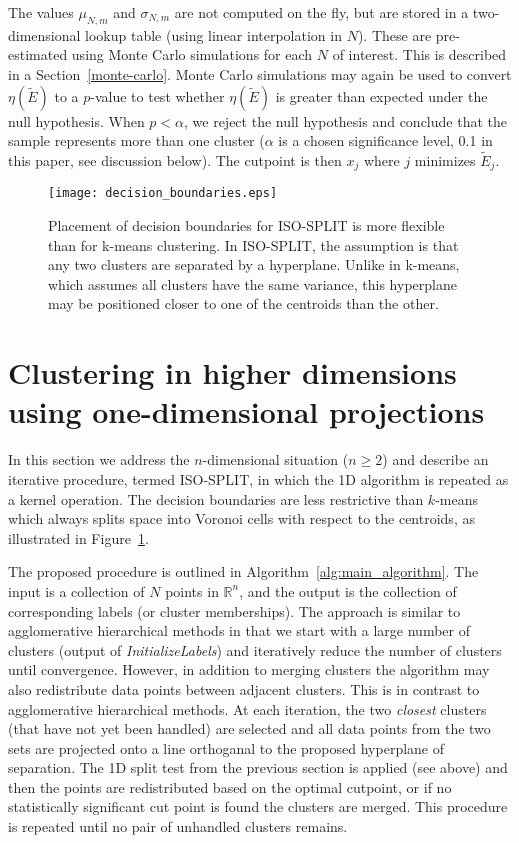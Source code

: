 \documentclass[10pt]{article}
\begin{document}
The values $\mu_{N,m}$ and $\sigma_{N,m}$ are not computed on the fly, but are stored in a two-dimensional lookup table (using linear interpolation in $N$). These are pre-estimated using Monte Carlo simulations for each $N$ of interest. This is described in a Section~\ref{monte-carlo}. Monte Carlo simulations may again be used to convert $\eta(\tilde{E})$ to a $p$-value to test whether $\eta(\tilde{E})$ is greater than expected under the null hypothesis. When $p<\alpha$, we reject the null hypothesis and conclude that the sample represents more than one cluster ($\alpha$ is a chosen significance level, 0.1 in this paper, see discussion below). The cutpoint is then $x_j$ where $j$ minimizes $\tilde{E}_j$.

\begin{figure}
\begin{center}
\texttt{[image: decision\_boundaries.eps]}
\end{center}
\caption{
Placement of decision boundaries for ISO-SPLIT is more flexible than for k-means clustering. In ISO-SPLIT, the assumption is that any two clusters are separated by a hyperplane. Unlike in k-means, which assumes all clusters have the same variance, this hyperplane may be positioned closer to one of the centroids than the other.
}
\label{fig:decision_boundaries}
\end{figure}

\section {Clustering in higher dimensions using one-dimensional projections}

\label{isosplit-algorithm}

In this section we address the $n$-dimensional situation ($n\geq2$) and describe an iterative procedure, termed ISO-SPLIT, in which the 1D algorithm is repeated as a kernel operation. The decision boundaries are less restrictive than $k$-means which always splits space into Voronoi cells with respect to the centroids, as illustrated in Figure~\ref{fig:decision_boundaries}.


The proposed procedure is outlined in Algorithm~\ref{alg:main_algorithm}. The input is a collection of $N$ points in $\mathbb{R}^n$, and the output is the collection of corresponding labels (or cluster memberships). The approach is similar to agglomerative hierarchical methods in that we start with a large number of clusters (output of \emph{InitializeLabels}) and iteratively reduce the number of clusters until convergence. However, in addition to merging clusters the algorithm may also redistribute data points between adjacent clusters. This is in contrast to agglomerative hierarchical methods. At each iteration, the two \emph{closest} clusters (that have not yet been handled) are selected and all data points from the two sets are projected onto a line orthoganal to the proposed hyperplane of separation. The 1D split test from the previous section is applied (see above) and then the points are redistributed based on the optimal cutpoint, or if no statistically significant cut point is found the clusters are merged. This procedure is repeated until no pair of unhandled clusters remains.
\end{document}
